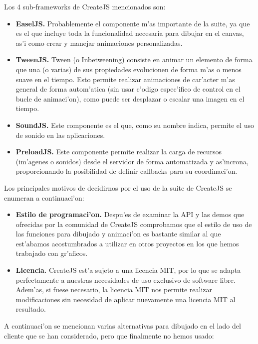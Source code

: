 Los 4 sub-frameworks de CreateJS mencionados son:

\begin{itemize}
\item \textbf{EaselJS.} Probablemente el componente m'as importante de la suite, ya que es el que incluye
toda la funcionalidad necesaria para dibujar en el canvas, as'i como crear y manejar animaciones
personalizadas.
\item \textbf{TweenJS.} Tween (o Inbetweening) consiste en animar un elemento de forma que una (o varias)
de sus propiedades evolucionen de forma m'as o menos suave en el tiempo. Esto permite realizar
animaciones de car'acter m'as general de forma autom'atica (sin usar c'odigo espec'ifico de 
control en el bucle de animaci'on), como puede ser desplazar o escalar una imagen en el tiempo.
\item \textbf{SoundJS.} Este componente es el que, como su nombre indica, permite el uso de sonido en las
aplicaciones.
\item \textbf{PreloadJS.} Este componente permite realizar la carga de recursos (im'agenes o sonidos) desde
el servidor de forma automatizada y as'incrona, proporcionando la posibilidad de definir callbacks
para su coordinaci'on.
\end{itemize}

Los principales motivos de decidirnos por el uso de la suite de CreateJS se enumeran a continuaci'on:

\begin{itemize}
\item \textbf{Estilo de programaci'on.} Despu'es de examinar la API y las demos que ofrecidas por la 
comunidad de CreateJS comprobamos que el estilo de uso de las funciones para dibujado y animaci'on
es bastante similar al que est'abamos acostumbrados a utilizar en otros proyectos en los que 
hemos trabajado con gr'aficos.
\item \textbf{Licencia.} CreateJS est'a sujeto a una licencia MIT, por lo que se adapta perfectamente a 
nuestras necesidades de uso exclusivo de software libre. Adem'as, si fuese necesario, la licencia
MIT nos permite realizar modificaciones sin necesidad de aplicar nuevamente una licencia MIT al 
resultado.
\end{itemize}

A continuaci'on se mencionan varias alternativas para dibujado en el lado del cliente que se han
considerado, pero que finalmente no hemos usado:


